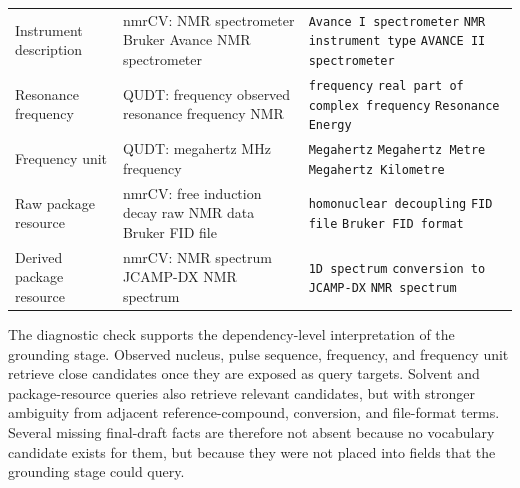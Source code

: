 \begin{table}[htbp]
\begin{tabularx}{\textwidth}{>{\raggedright\arraybackslash}p{}>{\raggedright\arraybackslash}p{}>{\raggedright\arraybackslash}X}
        Instrument description &
        \ac{nmrCV}:\newline
        NMR spectrometer\newline
        Bruker Avance NMR spectrometer &
        \texttt{Avance I spectrometer}\newline
        \texttt{NMR instrument type}\newline
        \texttt{AVANCE II spectrometer} \\
        Resonance frequency &
        \ac{QUDT}:\newline
        frequency\newline
        observed resonance frequency NMR &
        \texttt{frequency}\newline
        \texttt{real part of complex frequency}\newline
        \texttt{Resonance Energy} \\
        Frequency unit &
        \ac{QUDT}:\newline
        megahertz\newline
        MHz frequency &
        \texttt{Megahertz}\newline
        \texttt{Megahertz Metre}\newline
        \texttt{Megahertz Kilometre} \\
        Raw package resource &
        \ac{nmrCV}:\newline
        free induction decay raw NMR data\newline
        Bruker FID file &
        \texttt{homonuclear decoupling}\newline
        \texttt{FID file}\newline
        \texttt{Bruker FID format} \\
        Derived package resource &
        \ac{nmrCV}:\newline
        NMR spectrum\newline
        JCAMP-DX NMR spectrum &
        \texttt{1D spectrum}\newline
        \texttt{conversion to JCAMP-DX}\newline
        \texttt{NMR spectrum} \\
        \bottomrule
    \end{tabularx}
\end{table}

The diagnostic check supports the dependency-level interpretation of the grounding stage.
Observed nucleus, pulse sequence, frequency, and frequency unit retrieve close candidates once they are exposed as query targets.
Solvent and package-resource queries also retrieve relevant candidates, but with stronger ambiguity from adjacent reference-compound, conversion, and file-format terms.
Several missing final-draft facts are therefore not absent because no vocabulary candidate exists for them, but because they were not placed into fields that the grounding stage could query.

